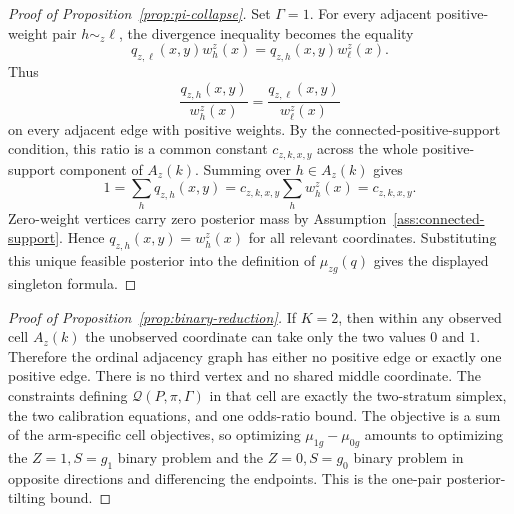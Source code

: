 \documentclass[11pt]{article}
\theoremstyle{definition}
\theoremstyle{plain}
\theoremstyle{remark}
\begin{document}
\begin{proof}[Proof of Proposition~\ref{prop:pi-collapse}]
Set \(\Gamma=1\).  For every adjacent positive-weight pair \(h\sim_z\ell\), the
divergence inequality becomes the equality
\[
  q_{z,\ell}(x,y)w^z_h(x)=q_{z,h}(x,y)w^z_\ell(x).
\]
Thus
\[
  \frac{q_{z,h}(x,y)}{w^z_h(x)}
  =
  \frac{q_{z,\ell}(x,y)}{w^z_\ell(x)}
\]
on every adjacent edge with positive weights.  By the connected-positive-support
condition, this ratio is a common constant \(c_{z,k,x,y}\) across the whole
positive-support component of \(A_z(k)\).  Summing over \(h\in A_z(k)\) gives
\[
  1=\sum_h q_{z,h}(x,y)
  =
  c_{z,k,x,y}\sum_h w^z_h(x)
  =
  c_{z,k,x,y}.
\]
Zero-weight vertices carry zero posterior mass by
Assumption~\ref{ass:connected-support}.  Hence \(q_{z,h}(x,y)=w^z_h(x)\) for
all relevant coordinates.  Substituting this unique feasible posterior into
the definition of \(\mu_{zg}(q)\) gives the displayed singleton formula.
\end{proof}

\begin{proof}[Proof of Proposition~\ref{prop:binary-reduction}]
If \(K=2\), then within any observed cell \(A_z(k)\) the unobserved coordinate
can take only the two values \(0\) and \(1\).  Therefore the ordinal adjacency
graph has either no positive edge or exactly one positive edge.  There is no
third vertex and no shared middle coordinate.  The constraints defining
\(\mathcal Q(P,\pi,\Gamma)\) in that cell are exactly the two-stratum simplex,
the two calibration equations, and one odds-ratio bound.  The objective is a
sum of the arm-specific cell objectives, so optimizing \(\mu_{1g}-\mu_{0g}\)
amounts to optimizing the \(Z=1,S=g_1\) binary problem and the
\(Z=0,S=g_0\) binary problem in opposite directions and differencing the
endpoints.  This is the one-pair posterior-tilting bound.
\end{proof}
\end{document}

